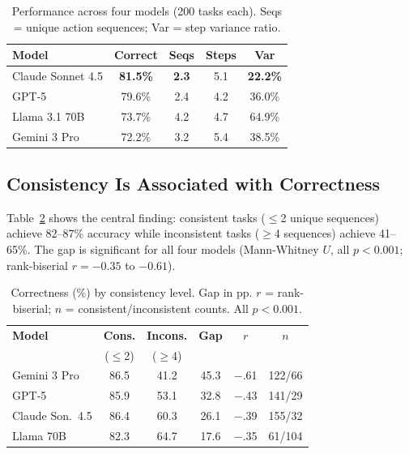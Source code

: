 \documentclass{article}
\begin{document}
\begin{table}[h]
\centering
\small
\caption{Performance across four models (200 tasks each). Seqs = unique action sequences; Var = step variance ratio.}
\label{tab:overall}
\begin{tabular}{lcccc}
\toprule
\textbf{Model} & \textbf{Correct} & \textbf{Seqs} & \textbf{Steps} & \textbf{Var} \\
\midrule
Claude Sonnet 4.5 & \textbf{81.5\%} & \textbf{2.3} & 5.1 & \textbf{22.2\%} \\
GPT-5 & 79.6\% & 2.4 & 4.2 & 36.0\% \\
Llama 3.1 70B & 73.7\% & 4.2 & 4.7 & 64.9\% \\
Gemini 3 Pro & 72.2\% & 3.2 & 5.4 & 38.5\% \\
\bottomrule
\end{tabular}
\end{table}

\subsection{Consistency Is Associated with Correctness}

Table~\ref{tab:consistency} shows the central finding: consistent tasks ($\leq$2 unique sequences) achieve 82--87\% accuracy while inconsistent tasks ($\geq$4 sequences) achieve 41--65\%. The gap is significant for all four models (Mann-Whitney $U$, all $p<0.001$; rank-biserial $r=-0.35$ to $-0.61$).

\begin{table}[h]
\centering
\small
\caption{Correctness (\%) by consistency level. Gap in pp. $r$ = rank-biserial; $n$ = consistent/inconsistent counts. All $p<0.001$.}
\label{tab:consistency}
\begin{tabular}{l@{\hskip 4pt}c@{\hskip 4pt}c@{\hskip 4pt}c@{\hskip 4pt}c@{\hskip 4pt}c}
\toprule
\textbf{Model} & \textbf{Cons.} & \textbf{Incons.} & \textbf{Gap} & \textbf{$r$} & \textbf{$n$} \\
 & ($\leq$2) & ($\geq$4) & & & \\
\midrule
Gemini 3 Pro & 86.5 & 41.2 & 45.3 & $-$.61 & 122/66 \\
GPT-5 & 85.9 & 53.1 & 32.8 & $-$.43 & 141/29 \\
Claude Son.\ 4.5 & 86.4 & 60.3 & 26.1 & $-$.39 & 155/32 \\
Llama 70B & 82.3 & 64.7 & 17.6 & $-$.35 & 61/104 \\
\bottomrule
\end{tabular}
\end{table}
\end{document}
